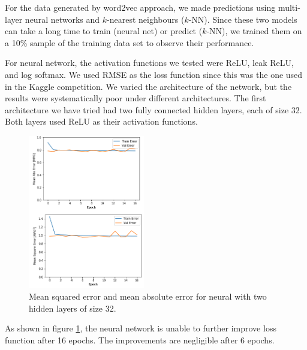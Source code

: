 \documentclass{sig-alternate-05-2015}
\begin{document}
For the data generated by word2vec approach, we made predictions using multi-layer neural networks and \(k\)-nearest neighbours (\(k\)-NN).
Since these two models can take a long time to train (neural net) or predict (\(k\)-NN), we trained them on a 10\% sample of the training
data set to observe their performance.

For neural network, the activation functions we tested were ReLU, leak ReLU, and log softmax. We used RMSE as the loss function since
this was the one used in the Kaggle competition. We varied the architecture of the network, but the results were systematically poor
under different architectures. The first architecture we have tried had two fully connected hidden layers, each of size 32. Both
layers used ReLU as their activation functions.
\begin{figure}
    \begin{center}
        \includegraphics[width=2in]{NN32.png}
        \caption{Mean squared error and mean absolute error for neural with two hidden layers of size 32.}
        \label{neuralnet32}
    \end{center}
\end{figure}
As shown in figure \ref{neuralnet32}, the neural network is unable to further improve loss function after 16 epochs.
The improvements are negligible after 6 epochs.
\end{document}
